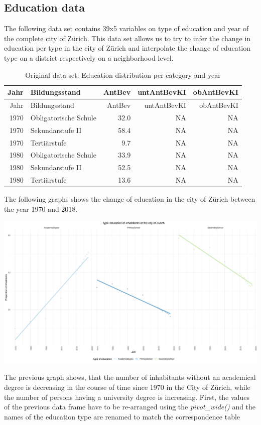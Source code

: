 \documentclass[
]{article}
\begin{document}
\newpage

\hypertarget{education-data}{%
\subsection{Education data}\label{education-data}}

The following data set contains 39x5 variables on type of education and
year of the complete city of Zürich. This data set allows us to try to
infer the change in education per type in the city of Zürich and
interpolate the change of education type on a district respectively on a
neighborhood level.

\begin{longtable}[]{@{}rlrrr@{}}
\caption{Original data set: Education distribution per category and
year}\tabularnewline
\toprule
Jahr & Bildungsstand & AntBev & untAntBevKI & obAntBevKI\tabularnewline
\midrule
\endfirsthead
\toprule
Jahr & Bildungsstand & AntBev & untAntBevKI & obAntBevKI\tabularnewline
\midrule
\endhead
1970 & Obligatorische Schule & 32.0 & NA & NA\tabularnewline
1970 & Sekundarstufe II & 58.4 & NA & NA\tabularnewline
1970 & Tertiärstufe & 9.7 & NA & NA\tabularnewline
1980 & Obligatorische Schule & 33.9 & NA & NA\tabularnewline
1980 & Sekundarstufe II & 52.5 & NA & NA\tabularnewline
1980 & Tertiärstufe & 13.6 & NA & NA\tabularnewline
\bottomrule
\end{longtable}

The following graphs shows the change of education in the city of Zürich
between the year 1970 and 2018.

\includegraphics{report_files/figure-latex/plot_education-1.pdf}

The previous graph shows, that the number of inhabitants without an
academical degree is decreasing in the course of time since 1970 in the
City of Zürich, while the number of persons having a university degree
is increasing. First, the values of the previous data frame have to be
re-arranged using the \emph{pivot\_wide()} and the names of the
education type are renamed to match the correspondence table
\end{document}
